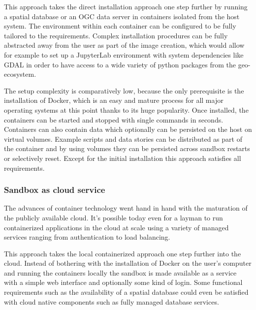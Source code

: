 \documentclass[11pt, a4paper, oneside, parskip=full-]{scrartcl}
\begin{document}
This approach takes the direct installation approach one step further by running
a spatial database or an OGC data server in containers isolated from the host
system. The environment within each container can be configured to be fully
tailored to the requirements. Complex installation procedures can be fully
abstracted away from the user as part of the image creation, which would allow
for example to set up a JupyterLab environment with system dependencies like
GDAL in order to have access to a wide variety of python packages from the
geo-ecosystem.

The setup complexity is comparatively low, because the only prerequisite is the
installation of Docker, which is an easy and mature process for all major
operating systems at this point thanks to its huge popularity. Once installed,
the containers can be started and stopped with single commands in seconds.
Containers can also contain data which optionally can be persisted on the host
on virtual volumes. Example scripts and data stories can be distributed as part
of the container and by using volumes they can be persisted across sandbox
restarts or selectively reset. Except for the initial installation this approach
satisfies all requirements.

\subsubsection*{Sandbox as cloud service}
The advances of container technology went hand in hand with the maturation of
the publicly available cloud. It's possible today even for a layman to run
containerized applications in the cloud at scale using a variety of managed
services ranging from authentication to load balancing.

This approach takes the local containerized approach one step further into the
cloud. Instead of bothering with the installation of Docker on the user's
computer and running the containers locally the sandbox is made available as a
service with a simple web interface and optionally some kind of login. Some
functional requirements such as the availability of a spatial database could
even be satisfied with cloud native components such as fully managed database
services.
\end{document}
